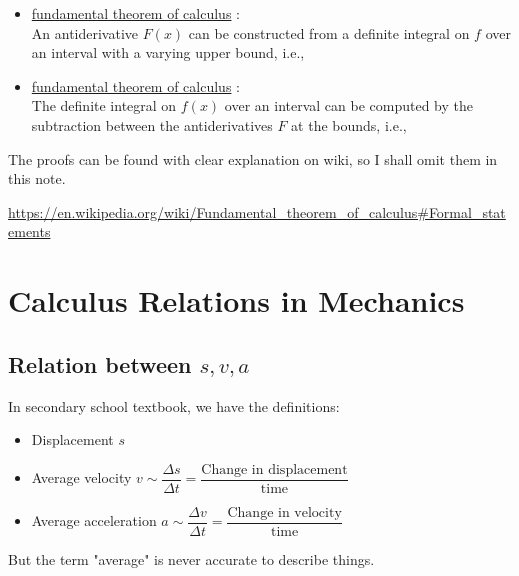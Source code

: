 \documentclass[class=article, crop=false, 12pt]{standalone}
\begin{document}
\begin{itemize}
    \item \ul{ fundamental theorem of calculus}  : \\[1em]
    An antiderivative $F(x)$ can be constructed from a definite integral on $f$ over an interval with a varying upper bound, i.e.,

    \item \ul{ fundamental theorem of calculus}  : \\[1em]
    The definite integral on $f(x)$ over an interval can be computed by the subtraction between the antiderivatives $F$ at the bounds, i.e.,
\end{itemize}

The proofs can be found with clear explanation on wiki, so I shall omit them in this note.

\url{https://en.wikipedia.org/wiki/Fundamental_theorem_of_calculus#Formal_statements}




\linesep
\section{Calculus Relations in Mechanics}


\subsection{Relation between $s,v,a$}

In secondary school textbook, we have the definitions:

\begin{itemize}
    \item Displacement $s$ 
    \item Average velocity $v \sim  \dfrac{\Delta s}{\Delta t} = \dfrac{\text{Change in displacement}}{\text{time}}$
    \item Average acceleration $a \sim \dfrac{\Delta v}{\Delta t} = \dfrac{\text{Change in velocity}}{\text{time}}$
\end{itemize}

But the term "average" is never accurate to describe things.

\end{document}
